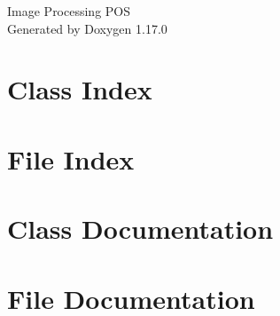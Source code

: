 \documentclass[twoside]{book}
\newcommand{\+}{\discretionary{\mbox{\scriptsize$\hookleftarrow$}}{}{}}
\newcommand{\clearemptydoublepage}{%
    \newpage{\pagestyle{empty}\cleardoublepage}%
  }
\begin{document}
  \raggedbottom
    \hypersetup{pageanchor=false,
                bookmarksnumbered=true,
                pdfencoding=unicode
               }
  \begin{titlepage}
  \vspace*{7cm}
  \begin{center}%
  {\Large Image Processing POS}\\
  \vspace*{1cm}
  {\large Generated by Doxygen 1.17.0}\\
  \end{center}
  \end{titlepage}
  \clearemptydoublepage
  \tableofcontents
  \clearemptydoublepage
  \hypersetup{pageanchor=true}
\chapter{Class Index}

\chapter{File Index}

\chapter{Class Documentation}

\chapter{File Documentation}

  \backmatter
  \newpage
  \clearemptydoublepage
  \printindex
\end{document}
